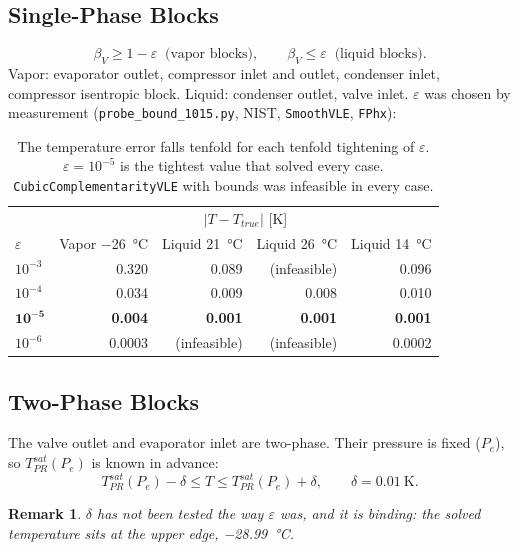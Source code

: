 \documentclass{article}
\newtheorem{remark}{Remark}
\begin{document}
\subsection{Single-Phase Blocks}
\begin{equation}
\beta_V \ge 1-\varepsilon \;\;\text{(vapor blocks)}, \qquad
\beta_V \le \varepsilon \;\;\text{(liquid blocks)}.
\end{equation}
Vapor: evaporator outlet, compressor inlet and outlet, condenser inlet,
compressor isentropic block. Liquid: condenser outlet, valve inlet.
$\varepsilon$ was chosen by measurement (\texttt{probe\_bound\_1015.py}, NIST,
\texttt{SmoothVLE}, \texttt{FPhx}):
\begin{table}[h]
\centering
\begin{tabular}{lrrrr}
\toprule
& \multicolumn{4}{c}{$|T - T_{true}|$ [K]} \\
$\varepsilon$ & Vapor \SI{-26}{\celsius} & Liquid \SI{21}{\celsius} & Liquid \SI{26}{\celsius} & Liquid \SI{14}{\celsius} \\
\midrule
$10^{-3}$ & 0.320 & 0.089 & (infeasible) & 0.096 \\
$10^{-4}$ & 0.034 & 0.009 & 0.008 & 0.010 \\
$\mathbf{10^{-5}}$ & \textbf{0.004} & \textbf{0.001} & \textbf{0.001} & \textbf{0.001} \\
$10^{-6}$ & 0.0003 & (infeasible) & (infeasible) & 0.0002 \\
\bottomrule
\end{tabular}
\caption{The temperature error falls tenfold for each tenfold tightening of
$\varepsilon$. $\varepsilon = 10^{-5}$ is the tightest value that solved
every case. \texttt{CubicComplementarityVLE} with bounds was infeasible in
every case.}
\end{table}

\subsection{Two-Phase Blocks}
The valve outlet and evaporator inlet are two-phase. Their pressure is fixed
($P_e$), so $T^{sat}_{PR}(P_e)$ is known in advance:
\begin{equation}
T^{sat}_{PR}(P_e) - \delta \le T \le T^{sat}_{PR}(P_e) + \delta, \qquad \delta = \SI{0.01}{\kelvin}.
\end{equation}
\begin{remark}
$\delta$ has not been tested the way $\varepsilon$ was, and it is binding:
the solved temperature sits at the upper edge, \SI{-28.99}{\celsius}.
\end{remark}
\end{document}

